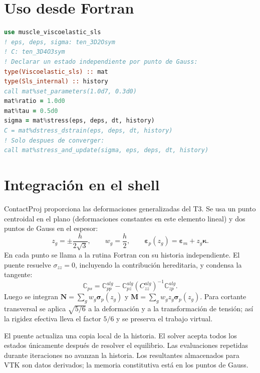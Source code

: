 \documentclass[10pt,a4paper]{article}
\begin{document}
\section*{Uso desde Fortran}
\begin{lstlisting}[language=Fortran]
use muscle_viscoelastic_sls
! eps, deps, sigma: ten_3D2Osym
! C: ten_3D4O3sym
! Declarar un estado independiente por punto de Gauss:
type(Viscoelastic_sls) :: mat
type(Sls_internal) :: history
call mat%set_parameters(1.0d7, 0.3d0)
mat%ratio = 1.0d0
mat%tau = 0.5d0
sigma = mat%stress(eps, deps, dt, history)
C = mat%dstress_dstrain(eps, deps, dt, history)
! Solo despues de converger:
call mat%stress_and_update(sigma, eps, deps, dt, history)
\end{lstlisting}
\newpage
\section*{Integración en el shell}
ContactProj proporciona las deformaciones generalizadas del T3. Se usa un punto
centroidal en el plano (deformaciones constantes en este elemento lineal) y dos
puntos de Gauss en el espesor:
\[
 z_g=\pm\frac{h}{2\sqrt3},\qquad w_g=\frac h2,\qquad
 \boldsymbol\varepsilon_p(z_g)=\boldsymbol\varepsilon_m+z_g\boldsymbol\kappa.
\]
En cada punto se llama a la rutina Fortran con su historia independiente. El puente
resuelve $\sigma_{zz}=0$, incluyendo la contribución hereditaria, y condensa la
tangente:
\[
 \mathbb C_{ps}=\mathbb C_{pp}^{alg}
 -\mathbb C_{pz}^{alg}(C_{zz}^{alg})^{-1}\mathbb C_{zp}^{alg}.
\]
Luego se integran $\mathbf N=\sum_g w_g\boldsymbol\sigma_p(z_g)$ y
$\mathbf M=\sum_g w_g z_g\boldsymbol\sigma_p(z_g)$. Para cortante transversal se
aplica $\sqrt{5/6}$ a la deformación y a la transformación de tensión; así la
rigidez efectiva lleva el factor $5/6$ y se preserva el trabajo virtual.

El puente actualiza una copia local de la historia. El solver acepta todos los
estados únicamente después de resolver el equilibrio. Las evaluaciones repetidas
durante iteraciones no avanzan la historia. Los resultantes almacenados para VTK
son datos derivados; la memoria constitutiva está en los puntos de Gauss.
\end{document}
